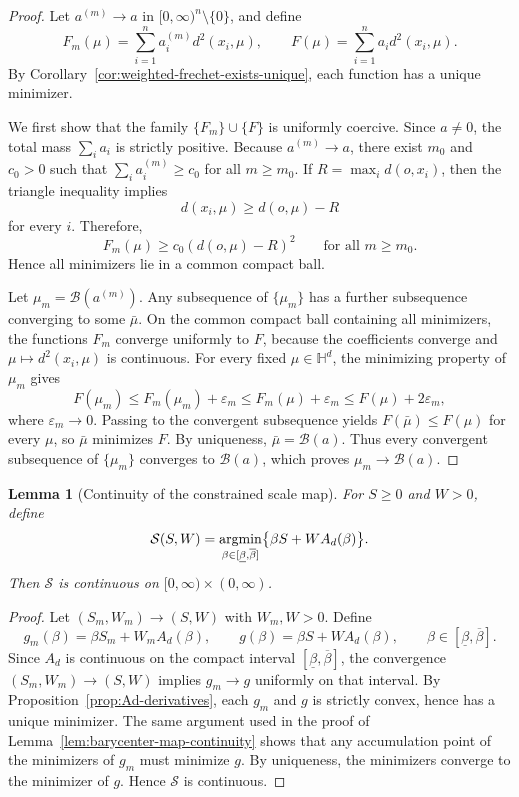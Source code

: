 \documentclass[11pt]{article}
\newtheorem{lemma}[theorem]{Lemma}
\begin{document}
\begin{proof}
Let \(a^{(m)}\to a\) in \([0,\infty)^n\setminus\{0\}\), and define
\[
F_m(\mu)
=
\sum_{i=1}^n a_i^{(m)}d^2(x_i,\mu),
\qquad
F(\mu)
=
\sum_{i=1}^n a_i d^2(x_i,\mu).
\]
By Corollary~\ref{cor:weighted-frechet-exists-unique}, each function has a unique minimizer.

We first show that the family \(\{F_m\}\cup\{F\}\) is uniformly coercive. Since \(a\neq 0\), the total mass \(\sum_i a_i\) is strictly positive. Because \(a^{(m)}\to a\), there exist \(m_0\) and \(c_0>0\) such that \(\sum_i a_i^{(m)}\ge c_0\) for all \(m\ge m_0\). If \(R=\max_i d(o,x_i)\), then the triangle inequality implies
\[
d(x_i,\mu)\ge d(o,\mu)-R
\]
for every \(i\). Therefore,
\[
F_m(\mu)\ge c_0(d(o,\mu)-R)^2
\qquad\text{for all }m\ge m_0.
\]
Hence all minimizers lie in a common compact ball.

Let \(\mu_m=\mathcal{B}(a^{(m)})\). Any subsequence of \(\{\mu_m\}\) has a further subsequence converging to some \(\bar{\mu}\). On the common compact ball containing all minimizers, the functions \(F_m\) converge uniformly to \(F\), because the coefficients converge and \(\mu\mapsto d^2(x_i,\mu)\) is continuous. For every fixed \(\mu\in\mathbb{H}^d\), the minimizing property of \(\mu_m\) gives
\[
F(\mu_m)
\le
F_m(\mu_m)+\varepsilon_m
\le
F_m(\mu)+\varepsilon_m
\le
F(\mu)+2\varepsilon_m,
\]
where \(\varepsilon_m\to 0\). Passing to the convergent subsequence yields \(F(\bar{\mu})\le F(\mu)\) for every \(\mu\), so \(\bar{\mu}\) minimizes \(F\). By uniqueness, \(\bar{\mu}=\mathcal{B}(a)\). Thus every convergent subsequence of \(\{\mu_m\}\) converges to \(\mathcal{B}(a)\), which proves \(\mu_m\to\mathcal{B}(a)\).
\end{proof}

\begin{lemma}[Continuity of the constrained scale map]\label{lem:scale-map-continuity}
For \(S\ge 0\) and \(W>0\), define
\[
\mathcal{S}(S,W)
=
\operatorname*{argmin}_{\beta\in[\underline{\beta},\overline{\beta}]}
\bigl\{\beta S+W A_d(\beta)\bigr\}.
\]
Then \(\mathcal{S}\) is continuous on \([0,\infty)\times(0,\infty)\).
\end{lemma}

\begin{proof}
Let \((S_m,W_m)\to(S,W)\) with \(W_m,W>0\). Define
\[
g_m(\beta)=\beta S_m+W_mA_d(\beta),
\qquad
g(\beta)=\beta S+W A_d(\beta),
\qquad
\beta\in[\underline{\beta},\overline{\beta}].
\]
Since \(A_d\) is continuous on the compact interval \([\underline{\beta},\overline{\beta}]\), the convergence \((S_m,W_m)\to(S,W)\) implies \(g_m\to g\) uniformly on that interval. By Proposition~\ref{prop:Ad-derivatives}, each \(g_m\) and \(g\) is strictly convex, hence has a unique minimizer. The same argument used in the proof of Lemma~\ref{lem:barycenter-map-continuity} shows that any accumulation point of the minimizers of \(g_m\) must minimize \(g\). By uniqueness, the minimizers converge to the minimizer of \(g\). Hence \(\mathcal{S}\) is continuous.
\end{proof}
\end{document}
